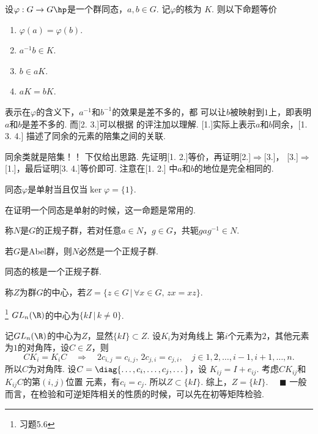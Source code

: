   \begin{thm}
    \label{thm: 同余、陪集}
    设$\varphi:G\to G\hp$是一个群同态，$a,b\in G$. 记$\varphi$的核为
    $K$. 则以下命题等价
    \begin{enumerate}
      \item $\varphi(a)=\varphi(b)$.
      \item $a^{-1}b\in K$.
      \item $b\in aK$.
      \item $aK = bK$.
    \end{enumerate}
  \end{thm}
  \remark
    [2.]表示在$\varphi$的含义下，$a^{-1}$和$b^{-1}$的效果是差不多的，都
    可以让$b$被映射到$1$上，即表明$a$和$b$是差不多的. 而[2. 3.]可以根据
    的评注加以理解. [1.]实际上表示$a$和$b$同余，[1. 3. 4.]
    描述了同余的元素的陪集之间的关联.\par
    同余类就是陪集！！
  \proof
    下仅给出思路. 先证明[1. 2.]等价，再证明[2.]$\Rightarrow$[3.]，
    [3.]$\Rightarrow$[1.]，最后证明[3. 4.]等价即可. 注意在[1. 2.]
    中$a$和$b$的地位是完全相同的.

  \begin{cor}[单射]
    同态$\varphi$是单射当且仅当$\ker\varphi = \{1\}$.
  \end{cor}
  \remark
    在证明一个同态是单射的时候，这一命题是常用的.

  \begin{defi}[正规子群]
    称$N$是$G$的正规子群，若对任意$a\in N$，$g\in G$，共轭$gag^{-1}\in N$.
  \end{defi}
  \remark
    若$G$是Abel群，则$N$必然是一个正规子群.

  \begin{thm}
    同态的核是一个正规子群.
  \end{thm}

  \begin{defi}[中心]
    称$Z$为群$G$的中心，若$Z=\{z\in G\,|\, \forall x\in G,\,zx=xz\}$.
  \end{defi}

  \begin{pos}
    \footnote{习题5.6}
    $GL_n(\R)$的中心为$\{kI\,|\,k\ne 0\}$.
  \end{pos}
  \proof
    记$GL_n(\R)$的中心为$Z$，显然$\{kI\}\subset Z$. 设$K_i$为对角线上
    第$i$个元素为$2$，其他元素为$1$的对角阵，设$C\in Z$，则
    \[
      CK_i = K_iC \quad\Rightarrow\quad
      2c_{i, j} = c_{i, j},\,2c_{j, i} = c_{j, i},
      \quad j\in{1,2,\dots,i-1,i+1,\dots,n}.
    \]
    所以$C$为对角阵. 设$C=\diag{\dots,c_i,\dots,c_j,\dots}$，设
    $K_{ij} = I+e_{ij}$. 考虑$CK_{ij}$和$K_{ij}C$的第$(i,j)$位置
    元素，有$c_i=c_j$. 所以$Z\subset\{kI\}$. 综上，$Z=\{kI\}$.
    $\quad\blacksquare$
  \remark
    一般而言，在检验和可逆矩阵相关的性质的时候，可以先在初等矩阵检验.

